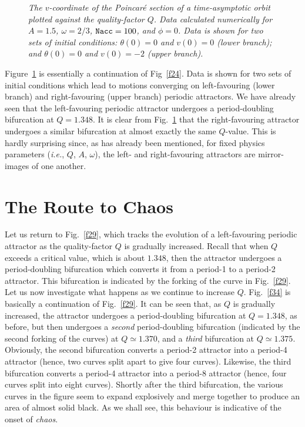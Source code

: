\begin{figure}
\epsfysize=3in
\centerline{}
\caption{\em The $v$-coordinate of the Poincar\'{e} section of a time-asymptotic orbit
plotted against the quality-factor $Q$. Data
 calculated numerically for
$A=1.5$, $\omega=2/3$, ${\tt Nacc} =100$, and $\phi=0$. Data is shown for two sets of initial
conditions: $\theta(0)=0$ and $v(0)=0$ (lower branch); and $\theta(0)=0$ and $v(0)=-2$ (upper branch).}\label{f32}
\end{figure}

Figure~\ref{f32} is essentially a continuation of Fig~\ref{f24}. Data is shown for two
sets of initial conditions which lead to motions converging on left-favouring (lower branch) and
right-favouring (upper branch) periodic attractors. We have already seen that the left-favouring
periodic attractor undergoes a period-doubling bifurcation at $Q=1.348$. It is clear from Fig.~\ref{f32}
that the right-favouring attractor undergoes a similar bifurcation at almost exactly the
same $Q$-value. This is hardly surprising since, as has already
been mentioned, for fixed physics parameters ({\em i.e.}, $Q$, $A$, $\omega$), the
left- and right-favouring attractors are mirror-images of one another.

\section{The Route to Chaos}\label{spd}
Let us return to Fig.~\ref{f29}, which tracks the evolution of a left-favouring
periodic attractor as the quality-factor $Q$ is gradually increased. Recall that when
$Q$ exceeds a critical value, which is about $1.348$, then the attractor
undergoes a period-doubling bifurcation which converts it from a period-1 to a period-2
attractor. This bifurcation is indicated by the forking of the curve in
Fig.~\ref{f29}. Let us now investigate what happens as we continue to increase $Q$. Fig.~\ref{f34} is basically
a continuation of Fig.~\ref{f29}. It can be seen that, as $Q$ is gradually
increased, the attractor undergoes a period-doubling bifurcation at $Q=1.348$, as before,
but then undergoes a {\em second} period-doubling bifurcation (indicated by the 
second forking of
the curves) at $Q\simeq 1.370$, and a {\em third} bifurcation at $Q\simeq 1.375$. Obviously, the second bifurcation
converts a period-2 attractor into a period-4 attractor (hence, two curves split apart to
give four curves). Likewise, the third bifurcation converts a period-4 attractor
into a period-8 attractor (hence, four curves split into eight curves). 
Shortly after the third
bifurcation, the various curves in the figure seem to expand explosively and  merge together
to produce an area of almost solid black. As we shall see, this behaviour is indicative
of the onset of {\em chaos}. 
 
